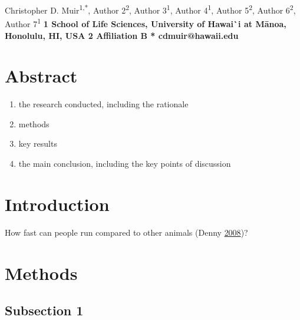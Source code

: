 \documentclass[10pt,]{article}
\title{}
\author{}
\date{}
\makeatletter
\providecommand{\tightlist}{%
  \setlength{\itemsep}{0pt}\setlength{\parskip}{0pt}}
\newcommand\iraggedright{%
  \let\\\@centercr\@rightskip\@flushglue \rightskip\@rightskip
  \leftskip\z@skip}
\makeatother
\begin{document}
\iraggedright

\begin{flushleft}
{\Large
\textbf{}
}
\newline
\\
Christopher D. Muir\textsuperscript{1,*},
Author 2\textsuperscript{2},
Author 3\textsuperscript{1},
Author 4\textsuperscript{1},
Author 5\textsuperscript{2},
Author 6\textsuperscript{2},
Author 7\textsuperscript{1}
\\
\bigskip
\bf{1} School of Life Sciences, University of Hawai\`{}i at M\=anoa, Honolulu, HI, USA
\\
\bf{2} Affiliation B
\\
\bigskip
* cdmuir@hawaii.edu

\end{flushleft}

\hypertarget{abstract}{%
\section{Abstract}\label{abstract}}

\begin{enumerate}
\def\labelenumi{\arabic{enumi}.}
\tightlist
\item
  the research conducted, including the rationale
\item
  methods
\item
  key results
\item
  the main conclusion, including the key points of discussion
\end{enumerate}

\linenumbers

\hypertarget{introduction}{%
\section{Introduction}\label{introduction}}

How fast can people run compared to other animals (Denny \protect\hyperlink{ref-denny_limits_2008}{2008})?

\hypertarget{methods}{%
\section{Methods}\label{methods}}

\hypertarget{subsection-1}{%
\subsection{Subsection 1}\label{subsection-1}}
\end{document}
